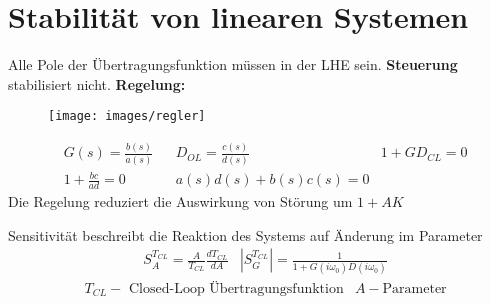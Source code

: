 \setcounter{section}{5}
\section{Stabilität von linearen Systemen}
\begin{tcolorbox}[colback=white!10!white,colframe=green!30!black,title=Stabilität] 
Alle Pole der Übertragungsfunktion müssen in der LHE sein. \textbf{Steuerung} stabilisiert nicht. 
\textbf{Regelung:}

    \begin{figure}[H]
        \centering
        \texttt{[image: images/regler]}
\end{figure}
    \begin{align*}
    &G(s) = \frac{b(s)}{a(s)}  && D_{OL} = \frac{c(s)}{d(s)}
    &1+ G D_{CL} = 0\\ 
    &1 + \frac{bc}{ad} = 0  &&
    a(s)d(s) + b(s)c(s) = 0 
    \end{align*}
Die Regelung reduziert die Auswirkung von Störung um $1+ AK$

\end{tcolorbox}

\begin{tcolorbox}[colback=white!10!white,colframe=green!30!black,title=Sensitivität] 
    Sensitivität beschreibt die Reaktion des Systems auf Änderung im Parameter
    \begin{align*}
        & S_{A}^{T_{CL}} = \frac{A}{T_{CL}}\frac{d T_{CL}}{dA}
        & |S_{G}^{T_{CL}}| = \frac{1}{1+G(i\omega_0)D(i\omega_0)}
        \end{align*}
    \begin{align*}
        &T_{CL} -\text{ Closed-Loop Übertragungsfunktion} & A - \text{Parameter}
    \end{align*}
\end{tcolorbox}



